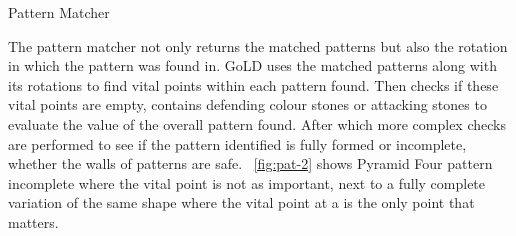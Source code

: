 \documentclass{l4proj}
\begin{document}
\begin{algorithm}[H]
\caption{Pattern Matcher}\label{Pattern Matcher}
    \DontPrintSemicolon
\end{algorithm}

The pattern matcher not only returns the matched patterns but also the rotation in which the pattern was found in. GoLD uses the matched patterns along with its rotations to find vital points within each pattern found. Then checks if these vital points are empty, contains defending colour stones or attacking stones to evaluate the value of the overall pattern found. After which more complex checks are performed to see if the pattern identified is fully formed or incomplete, whether the walls of patterns are safe. ~\autoref{fig:pat-2} shows Pyramid Four pattern incomplete where the vital point is not as important, next to a fully complete variation of the same shape where the vital point at a is the only point that matters.
\end{document}
